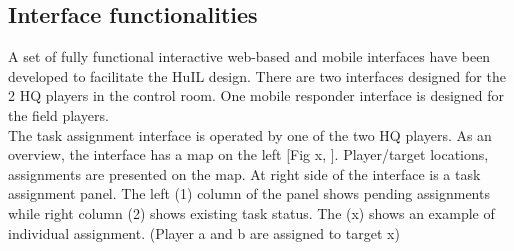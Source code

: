 



\subsection{Interface functionalities}
A set of fully functional interactive web-based and mobile interfaces have been developed to facilitate the HuIL design. There are two interfaces designed for the 2 HQ players in the control room. One mobile responder interface is designed for the field players. \\

The task assignment interface is operated by one of the two HQ players. As an overview, the interface has a map on the left [Fig x, ]. Player/target locations, assignments are presented on the map. At right side of the interface is a task assignment panel. The left (1) column of the panel shows pending assignments while right column (2) shows existing task status. The (x) shows an example of individual assignment. (Player a and b are assigned to target x)\\

